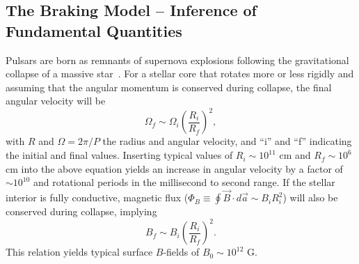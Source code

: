 \documentclass{PoS}
\newcommand{\beq}{\begin{equation}}
\newcommand{\eeq}{\end{equation}}
\begin{document}
\subsection{The Braking Model -- Inference of Fundamental Quantities}
Pulsars are born as remnants of supernova explosions following the gravitational collapse of a massive star~\cite{BaadeZwicky34}. For a stellar core that rotates more or less rigidly and assuming that the angular momentum is conserved during collapse, the final angular velocity will be
\beq
\Omega_f \sim \Omega_i\left(\frac{R_i}{R_f}\right)^2,
\eeq
with $R$ and $\Omega=2\pi/P$ the radius and angular velocity, and ``i'' and ``f'' indicating the initial and final values. Inserting typical values of $R_i \sim 10^{11}$ cm and $R_f\sim 10^6$ cm into the above equation yields an increase in angular velocity by a factor of $\sim 10^{10}$ and rotational periods in the millisecond to second range. If the stellar interior is fully conductive, magnetic flux ($\Phi_B \equiv \oint \vec{B} \cdot d\vec{a} \sim B_iR_i^2$) will also be conserved during collapse, implying\beq
B_f \sim B_i\left(\frac{R_i}{R_f}\right)^2.
\eeq
This relation yields typical surface $B$-fields of $B_0\sim 10^{12}$ G. 
\end{document}
